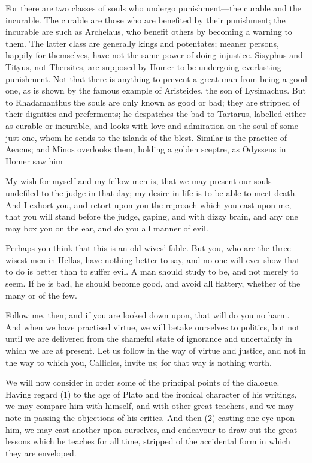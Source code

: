 \documentclass[11pt,letter]{article}
\begin{document}
\par  For there are two classes of souls who undergo punishment—the curable and the incurable. The curable are those who are benefited by their punishment; the incurable are such as Archelaus, who benefit others by becoming a warning to them. The latter class are generally kings and potentates; meaner persons, happily for themselves, have not the same power of doing injustice. Sisyphus and Tityus, not Thersites, are supposed by Homer to be undergoing everlasting punishment. Not that there is anything to prevent a great man from being a good one, as is shown by the famous example of Aristeides, the son of Lysimachus. But to Rhadamanthus the souls are only known as good or bad; they are stripped of their dignities and preferments; he despatches the bad to Tartarus, labelled either as curable or incurable, and looks with love and admiration on the soul of some just one, whom he sends to the islands of the blest. Similar is the practice of Aeacus; and Minos overlooks them, holding a golden sceptre, as Odysseus in Homer saw him
 
\par  My wish for myself and my fellow-men is, that we may present our souls undefiled to the judge in that day; my desire in life is to be able to meet death. And I exhort you, and retort upon you the reproach which you cast upon me,—that you will stand before the judge, gaping, and with dizzy brain, and any one may box you on the ear, and do you all manner of evil.

\par  Perhaps you think that this is an old wives’ fable. But you, who are the three wisest men in Hellas, have nothing better to say, and no one will ever show that to do is better than to suffer evil. A man should study to be, and not merely to seem. If he is bad, he should become good, and avoid all flattery, whether of the many or of the few.

\par  Follow me, then; and if you are looked down upon, that will do you no harm. And when we have practised virtue, we will betake ourselves to politics, but not until we are delivered from the shameful state of ignorance and uncertainty in which we are at present. Let us follow in the way of virtue and justice, and not in the way to which you, Callicles, invite us; for that way is nothing worth.

\par  We will now consider in order some of the principal points of the dialogue. Having regard (1) to the age of Plato and the ironical character of his writings, we may compare him with himself, and with other great teachers, and we may note in passing the objections of his critics. And then (2) casting one eye upon him, we may cast another upon ourselves, and endeavour to draw out the great lessons which he teaches for all time, stripped of the accidental form in which they are enveloped.
\end{document}
